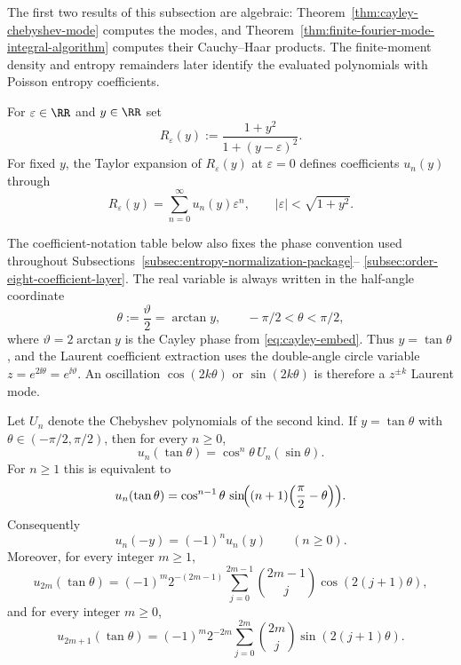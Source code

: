 The first two results of this subsection are algebraic:
Theorem~\ref{thm:cayley-chebyshev-mode} computes the modes, and
Theorem~\ref{thm:finite-fourier-mode-integral-algorithm} computes their
Cauchy--Haar products.  The finite-moment density and entropy remainders later
identify the evaluated polynomials with Poisson entropy coefficients.

For $\varepsilon\in\RR$ and $y\in\RR$ set
\begin{equation}\label{eq:cayley-comparison-kernel}
R_\varepsilon(y):=\frac{1+y^2}{1+(y-\varepsilon)^2}.
\end{equation}
For fixed $y$, the Taylor expansion of $R_\varepsilon(y)$ at
$\varepsilon=0$ defines coefficients $u_n(y)$ through
\begin{equation}\label{eq:cayley-mode-series}
R_\varepsilon(y)=\sum_{n=0}^{\infty}u_n(y)\varepsilon^n,
\qquad
|\varepsilon|<\sqrt{1+y^2}.
\end{equation}

The coefficient-notation table below also fixes the phase convention used
throughout Subsections~\ref{subsec:entropy-normalization-package}--%
\ref{subsec:order-eight-coefficient-layer}.  The real variable is always written in
the half-angle coordinate
\[
\theta:=\frac{\vartheta}{2}=\arctan y,\qquad -\pi/2<\theta<\pi/2,
\]
where \(\vartheta=2\arctan y\) is the Cayley phase from
\eqref{eq:cayley-embed}.  Thus \(y=\tan\theta\), and the Laurent coefficient
extraction uses the double-angle circle variable \(z=e^{2\ii\theta}
=e^{\ii\vartheta}\).  An oscillation \(\cos(2k\theta)\) or
\(\sin(2k\theta)\) is therefore a \(z^{\pm k}\) Laurent mode.

\begin{theorem}%
\label{thm:cayley-chebyshev-mode}
Let $U_n$ denote the Chebyshev polynomials of the second kind.  If
$y=\tan\theta$ with $\theta\in(-\pi/2,\pi/2)$, then for every $n\ge 0$,
\begin{equation}\label{eq:cayley-chebyshev-mode}
u_n(\tan\theta)=\cos^n\theta\,U_n(\sin\theta).
\end{equation}
For $n\ge 1$ this is equivalent to
\begin{equation}\label{eq:cayley-chebyshev-trig}
u_n(\tan\theta)
=\cos^{n-1}\theta\,
\sin\!\Bigl((n+1)\Bigl(\frac{\pi}{2}-\theta\Bigr)\Bigr).
\end{equation}
Consequently
\begin{equation}\label{eq:cayley-mode-parity}
u_n(-y)=(-1)^n u_n(y)
\qquad(n\ge 0).
\end{equation}
Moreover, for every integer $m\ge 1$,
\begin{equation}\label{eq:cayley-mode-even-fourier}
u_{2m}(\tan\theta)
=(-1)^m 2^{-(2m-1)}
\sum_{j=0}^{2m-1}\binom{2m-1}{j}\cos(2(j+1)\theta),
\end{equation}
and for every integer $m\ge 0$,
\begin{equation}\label{eq:cayley-mode-odd-fourier}
u_{2m+1}(\tan\theta)
=(-1)^m 2^{-2m}
\sum_{j=0}^{2m}\binom{2m}{j}\sin(2(j+1)\theta).
\end{equation}
\end{theorem}

